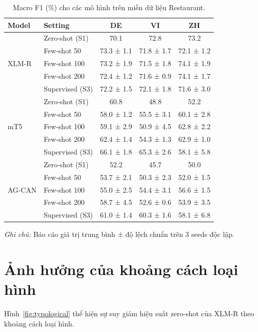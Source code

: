 \documentclass[12pt,a4paper,oneside]{report}
\begin{document}
\begin{table}[ht]
\centering
\caption{Macro F1 (\%) cho các mô hình trên miền dữ liệu Restaurant.}
\label{tab:main}
\begin{tabular}{l l c c c}
\toprule
Model & Setting & DE & VI & ZH \\
\midrule
\multirow{5}{*}{XLM-R} 
    & Zero-shot (S1) & 70.1 & 72.8 & 73.2 \\
    & Few-shot 50 & 73.3 ± 1.1 & 71.8 ± 1.7 & 72.1 ± 1.2 \\
    & Few-shot 100 & 73.2 ± 1.9 & 71.5 ± 1.8 & 74.1 ± 1.9 \\
    & Few-shot 200 & 72.4 ± 1.2 & 71.6 ± 0.9 & 74.1 ± 1.7 \\
    & Supervised (S3) & 72.2 ± 1.5 & 72.1 ± 1.8 & 71.6 ± 3.0 \\
\midrule
\multirow{5}{*}{mT5}
    & Zero-shot (S1) & 60.8 & 48.8 & 52.2 \\
    & Few-shot 50 & 58.0 ± 1.2 & 55.5 ± 3.1 & 60.1 ± 2.8 \\
    & Few-shot 100 & 59.1 ± 2.9 & 50.9 ± 4.5 & 62.8 ± 2.2 \\
    & Few-shot 200 & 62.4 ± 1.4 & 54.3 ± 1.3 & 62.9 ± 1.0 \\
    & Supervised (S3) & 66.1 ± 1.8 & 65.3 ± 2.6 & 58.1 ± 5.8 \\
\midrule
\multirow{5}{*}{AG-CAN}
    & Zero-shot (S1) & 52.2 & 45.7 & 50.0 \\
    & Few-shot 50 & 53.7 ± 2.1 & 50.3 ± 2.3 & 52.0 ± 1.5 \\
    & Few-shot 100 & 55.0 ± 2.5 & 54.4 ± 3.1 & 56.6 ± 1.5 \\
    & Few-shot 200 & 58.7 ± 4.5 & 52.6 ± 0.6 & 53.9 ± 3.5 \\
    & Supervised (S3) & 61.0 ± 1.4 & 60.3 ± 1.6 & 58.1 ± 6.8 \\
\bottomrule
\end{tabular}
\normalsize
\footnotesize
\textit{Ghi chú:} Báo cáo giá trị trung bình ± độ lệch chuẩn trên 3 seeds độc lập.
\end{table}

\section{Ảnh hưởng của khoảng cách loại hình}
Hình~\ref{fig:typological} thể hiện sự suy giảm hiệu suất zero-shot của XLM-R theo khoảng cách loại hình.
\end{document}
